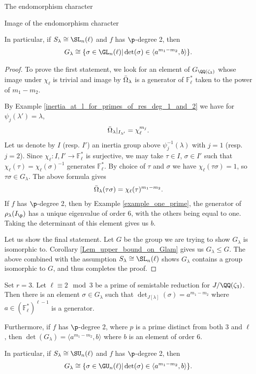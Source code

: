 \documentclass[11pt,a4paper]{article}
\newcommand{\Fl}{\mathbb{F}_\ell}
\newcommand{\Gcyclo}[1]{G_{\QQ(\zeta_{#1})}}
\newcommand{\Glam}{G_{\lambda}}
\newcommand{\Slam}{S_{\lambda}}
\begin{document}
\begin{section}{The endomorphism character}
\begin{subsection}{Image of the endomorphism character}
\begin{proposition}
  In particular, if $\Slam \cong \SL_n(\ell)$ and $f$ has $\p$-degree 2, then 
 \[\Glam \cong  \{ \sigma \in \GL_n(\ell)| \det(\sigma) \in \langle a^{m_1-m_2},b\rangle \}.
\]
\end{proposition}

\begin{proof}
To prove the first statement, we look for an element of $\Gcyclo{3}$ whose image under $\chi_\ell$ is trivial and image by $\Bar{\Omega}_\lambda$ is a generator of $\Fl^*$ taken to the power of $m_1-m_2$.


By Example \ref{inertia_at_l_for_primes_of_res_deg_1_and_2} we have for $ \psi_j(\lambda') = \lambda$,
\[
\Bar{\Omega}_\lambda|_{I_{\lambda'}} = \chi_\ell^{m_j}.
\]
Let us denote by $I$ (resp. $I'$) an inertia group above $\psi^{-1}_j(\lambda)$ with $j= 1$ (resp.  $j= 2$). Since $\chi_\ell:I,I' \rightarrow \Fl^*$ is surjective, we may take $\tau \in I$, $\sigma \in I'$ such that $\chi_\ell(\tau)= \chi_\ell(\sigma)^{-1}$ generates $\Fl^*$. By choice of $\tau$ and $\sigma$ we have $\chi_\ell(\tau \sigma)=1$, so $\tau\sigma \in \Glam$. The above formula gives
\[
\Bar{\Omega}_\lambda(\tau \sigma) = \chi_\ell(\tau)^{m_1-m_2}.
\]
If $f$ has $\p$-degree 2, then by Example \ref{example_one_prime}, the generator of $\rho_\lambda(I_\p)$ has a unique eigenvalue of order $6$, with the others being equal to one. Taking the determinant of this element gives us $b$. 

Let us show the final statement. Let $G$ be the group we are trying to show $\Glam$ is isomorphic to. Corollary \ref{Lem_upper_bound_on_Glam} gives us $\Glam \leq G$. The above combined with the assumption $\Slam \cong \SL_n(\ell)$ shows $\Glam$ contains a group isomorphic to $G$, and thus completes the proof. 
\end{proof}


\begin{proposition}
\label{Prop_l_2_mod_3_full_Glam}
Set $r =3$. Let $\ell \equiv 2 \mod{3}$ be a prime of semistable reduction for $J/\QQ(\zeta_3)$. Then there is an element $\sigma \in \Glam$ such that $\det_{J[\lambda]}(\sigma) = a^{m_1-m_2}$ where $a \in (\Fl^*)^{\ell-1}$ is a generator.

Furthermore, if $f$ has $\p$-degree 2, where $p$ is a prime distinct from both $3$ and $\ell$, then $\det(\Glam)= \langle a^{m_1-m_2},b\rangle $
 where $b$ is an element of order $6$.
 
 In particular, if $\Slam \cong \SU_n(\ell)$ and $f$ has $\p$-degree 2, then 
 \[\Glam \cong  \{ \sigma \in \GU_n(\ell)| \det(\sigma) \in \langle a^{m_1-m_2},b\rangle \}.
\]
\end{proposition}


\end{subsection}
\end{section}
\end{document}
